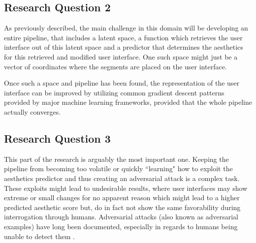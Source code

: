 \documentclass[10pt,a4paper]{scrartcl} %
\begin{document}
\subsection{Research Question 2}
As previously described, the main challenge in this domain will be developing an entire pipeline, that includes a latent space, a function which retrieves the user interface out of this latent space and a predictor that determines the aesthetics for this retrieved and modified user interface. One such space might just be a vector of coordinates where the segments are placed on the user interface. 


Once such a space and pipeline has been found, the representation of the user interface can be improved by utilizing
common gradient descent patterns provided by major machine learning frameworks, provided that the whole pipeline actually converges.



%
%
%
\subsection{Research Question 3}
This part of the research is arguably the most important one. Keeping the pipeline from becoming too volatile or quickly ``learning" how to exploit the aesthetics predictor and thus creating an adversarial attack is a complex task. These exploits might lead to undesirable results, where user interfaces may show extreme or small changes for no apparent reason which might lead to a higher predicted aesthetic score but,  do in fact not show the same favorability during interrogation through humans. Adversarial attacks (also known as adversarial examples) have long been documented, especially in regards to humans being unable to detect them \cite{G_pfert_2020}.
\end{document}
